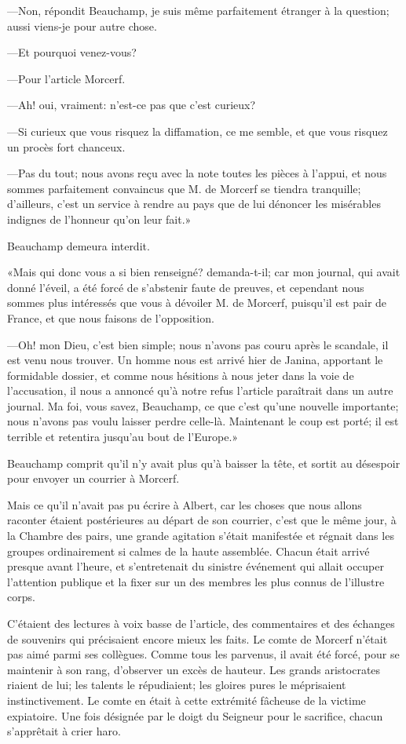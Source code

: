 —Non, répondit Beauchamp, je suis même parfaitement étranger à la question; aussi viens-je pour autre chose. 

—Et pourquoi venez-vous? 

—Pour l'article Morcerf. 

—Ah! oui, vraiment: n'est-ce pas que c'est curieux? 

—Si curieux que vous risquez la diffamation, ce me semble, et que vous risquez un procès fort chanceux. 

—Pas du tout; nous avons reçu avec la note toutes les pièces à l'appui, et nous sommes parfaitement convaincus que M. de Morcerf se tiendra tranquille; d'ailleurs, c'est un service à rendre au pays que de lui dénoncer les misérables indignes de l'honneur qu'on leur fait.» 

Beauchamp demeura interdit. 

«Mais qui donc vous a si bien renseigné? demanda-t-il; car mon journal, qui avait donné l'éveil, a été forcé de s'abstenir faute de preuves, et cependant nous sommes plus intéressés que vous à dévoiler M. de Morcerf, puisqu'il est pair de France, et que nous faisons de l'opposition. 

—Oh! mon Dieu, c'est bien simple; nous n'avons pas couru après le scandale, il est venu nous trouver. Un homme nous est arrivé hier de Janina, apportant le formidable dossier, et comme nous hésitions à nous jeter dans la voie de l'accusation, il nous a annoncé qu'à notre refus l'article paraîtrait dans un autre journal. Ma foi, vous savez, Beauchamp, ce que c'est qu'une nouvelle importante; nous n'avons pas voulu laisser perdre celle-là. Maintenant le coup est porté; il est terrible et retentira jusqu'au bout de l'Europe.» 

Beauchamp comprit qu'il n'y avait plus qu'à baisser la tête, et sortit au désespoir pour envoyer un courrier à Morcerf. 

Mais ce qu'il n'avait pas pu écrire à Albert, car les choses que nous allons raconter étaient postérieures au départ de son courrier, c'est que le même jour, à la Chambre des pairs, une grande agitation s'était manifestée et régnait dans les groupes ordinairement si calmes de la haute assemblée. Chacun était arrivé presque avant l'heure, et s'entretenait du sinistre événement qui allait occuper l'attention publique et la fixer sur un des membres les plus connus de l'illustre corps. 

C'étaient des lectures à voix basse de l'article, des commentaires et des échanges de souvenirs qui précisaient encore mieux les faits. Le comte de Morcerf n'était pas aimé parmi ses collègues. Comme tous les parvenus, il avait été forcé, pour se maintenir à son rang, d'observer un excès de hauteur. Les grands aristocrates riaient de lui; les talents le répudiaient; les gloires pures le méprisaient instinctivement. Le comte en était à cette extrémité fâcheuse de la victime expiatoire. Une fois désignée par le doigt du Seigneur pour le sacrifice, chacun s'apprêtait à crier haro. 

